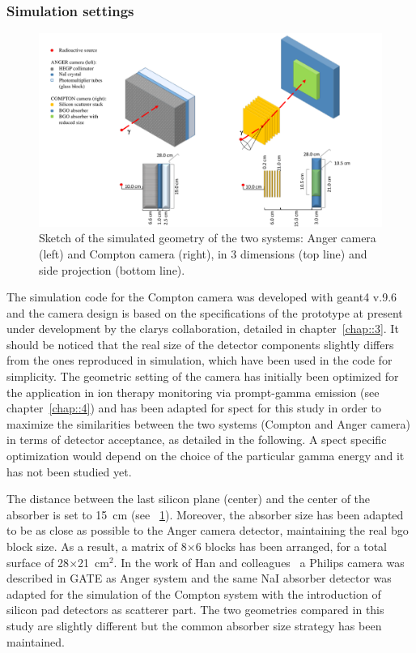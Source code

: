 \subsubsection{Simulation settings}\label{chap5::subsubsec::CC_settings}
\begin{figure}
  \centering
  \includegraphics[width=1.1\linewidth]{03_GraphicFiles/chapter5_SPECTsimu/SPECT/schema_withRedAbs}
  \caption{Sketch of the simulated geometry of the two systems: Anger camera (left) and Compton camera (right), in 3 dimensions (top line) and side projection (bottom line).}
  \label{chap5::fig::geometry_schema}
\end{figure}

The simulation code for the Compton camera was developed with \gls{geant4} v.9.6 and the camera design is based on the specifications of the prototype at present under development by the \gls{clarys} collaboration, detailed in chapter~\ref{chap::3}. It should be noticed that the real size of the detector components slightly differs from the ones reproduced in simulation, which have been used in the code for simplicity. The geometric setting of the camera has initially been optimized for the application in ion therapy monitoring via prompt-gamma emission (see chapter~\ref{chap::4}) and has been adapted for \gls{spect} for this study in order to maximize the similarities between the two systems (Compton and Anger camera) in terms of detector acceptance, as detailed in the following. A \gls{spect} specific optimization would depend on the choice of the particular gamma energy and it has not been studied yet.

The distance between the last silicon plane (center) and the center of the absorber is set to 15~cm (see \figurename~\ref{chap5::fig::geometry_schema}).  Moreover, the absorber size has been adapted to be as close as possible to the Anger camera detector, maintaining the real \gls{bgo} block size. As a result, a matrix of 8$\times$6 blocks has been arranged, for a total surface of 28$\times$21~cm$^{2}$.
In the work of Han and colleagues~\parencite{Han2008} a Philips camera was described in GATE as Anger system and the same NaI absorber detector was adapted for the simulation of the Compton system with the introduction of silicon pad detectors as scatterer part. The two geometries compared in this study are slightly different but the common absorber size strategy has been maintained.


